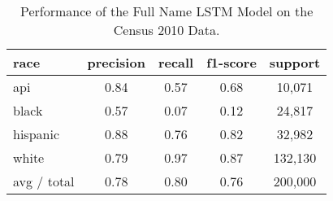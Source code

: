 \documentclass[12pt, letterpaper]{article}
\begin{document}
\begin{table}[h!]
\centering
\caption{Performance of the Full Name LSTM Model on the Census 2010 Data.}
\begin{tabular}{ l c c c c }
\hline    
   race & precision & recall & f1-score & support\\
\hline
        api &      0.84  &    0.57   &  0.68  &  10,071\\
      black &      0.57  &    0.07   &  0.12  &  24,817\\
   hispanic &      0.88  &    0.76   &  0.82  &  32,982\\
      white &      0.79  &    0.97   &  0.87  &  132,130\\

avg / total &      0.78   &   0.80 &    0.76  & 200,000\\
\hline
\end{tabular}
\label{table:last_name_census_2010}
\end{table}
\end{document}
